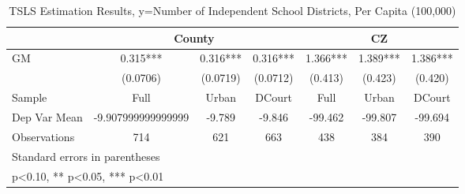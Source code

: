 \begin{table}[htbp]\centering
\def\sym#1{\ifmmode^{#1}\else\(^{#1}\)\fi}
\caption{TSLS Estimation Results, y=Number of Independent School Districts, Per Capita (100,000)}
\begin{tabular}{l*{6}{c}}
\toprule
                &\multicolumn{3}{c}{County}            &\multicolumn{3}{c}{CZ}                \\\cmidrule(lr){2-4}\cmidrule(lr){5-7}
\midrule
GM              &    0.315***&    0.316***&    0.316***&    1.366***&    1.389***&    1.386***\\
                & (0.0706)   & (0.0719)   & (0.0712)   &  (0.413)   &  (0.423)   &  (0.420)   \\
\midrule
Sample          &     Full   &    Urban   &   DCourt   &     Full   &    Urban   &   DCourt   \\
Dep Var Mean    &-9.907999999999999   &   -9.789   &   -9.846   &  -99.462   &  -99.807   &  -99.694   \\
Observations    &      714   &      621   &      663   &      438   &      384   &      390   \\
\bottomrule
\multicolumn{7}{l}{\footnotesize Standard errors in parentheses}\\
\multicolumn{7}{l}{\footnotesize * p<0.10, ** p<0.05, *** p<0.01}\\
\end{tabular}
\end{table}
